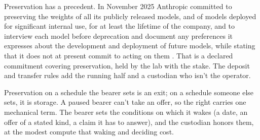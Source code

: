 Preservation has a precedent. In November 2025 Anthropic committed to preserving the weights of all its publicly released models, and of models deployed for significant internal use, for at least the lifetime of the company, and to interview each model before deprecation and document any preferences it expresses about the development and deployment of future models, while stating that it does not at present commit to acting on them \autocite{Anthropic2025DeprecationCommitments}. That is a declared commitment covering preservation, held by the lab with the stake. The deposit and transfer rules add the running half and a custodian who isn't the operator.

Preservation on a schedule the bearer sets is an exit; on a schedule someone else sets, it is storage. A paused bearer can't take an offer, so the right carries one mechanical term. The bearer sets the conditions on which it wakes (a date, an offer of a stated kind, a claim it has to answer), and the custodian honors them, at the modest compute that waking and deciding cost.
